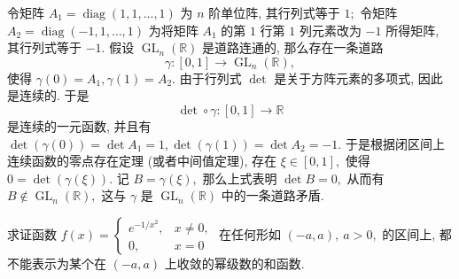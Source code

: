 \begin{solution}
令矩阵 $A_1 = \operatorname{diag}(1, 1, \dots, 1)$ 为 $n$ 阶单位阵, 其行列式等于 $1;$ 令矩阵 $A_2 = \operatorname{diag}(-1, 1, \dots, 1)$ 为将矩阵 $A_1$ 的第 $1$ 行第 $1$ 列元素改为 $-1$ 所得矩阵, 其行列式等于 $-1.$ 假设 $\operatorname{GL}_n(\mathbb{R})$ 是道路连通的, 那么存在一条道路
\[\gamma: [0, 1] \longrightarrow \operatorname{GL}_n(\mathbb{R}),\]
使得 $\gamma(0) = A_1, \gamma(1) = A_2.$
由于行列式 $\det$ 是关于方阵元素的多项式, 因此是连续的. 于是
\[\det\circ\gamma: [0, 1] \longrightarrow \mathbb{R}\]
是连续的一元函数, 并且有 $\det(\gamma(0)) = \det A_1 = 1, \det(\gamma(1)) = \det A_2 = -1.$ 于是根据闭区间上连续函数的零点存在定理 (或者中间值定理), 存在 $\xi \in [0, 1],$ 使得 $0 = \det(\gamma(\xi)).$ 记 $B = \gamma(\xi),$ 那么上式表明 $\det B = 0,$ 从而有 $B \not\in \operatorname{GL}_n(\mathbb{R}),$ 这与 $\gamma$ 是 $\operatorname{GL}_n(\mathbb{R})$ 中的一条道路矛盾.
\end{solution}

\begin{question}[points = 10]
求证函数 $f(x) = \begin{cases}
e^{-1/x^2}, & x \neq 0, \\
0, & x = 0
\end{cases}$ 在任何形如 $(-a, a), ~ a > 0,$ 的区间上, 都不能表示为某个在 $(-a, a)$ 上收敛的幂级数的和函数.

\end{question}

